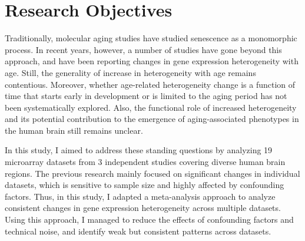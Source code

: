 \section{Research Objectives}
Traditionally, molecular aging studies have studied senescence as a monomorphic process. 
In recent years, however, a number of studies have gone beyond this approach, 
and have been reporting changes in gene expression heterogeneity with age. 
Still, the generality of increase in heterogeneity with age remains contentious.
Moreover, whether age-related heterogeneity change is a function of time that starts early in development or 
is limited to the aging period has not been systematically explored.
Also, the functional role of increased heterogeneity and 
its potential contribution to the emergence of aging-associated phenotypes in the human brain still remains unclear.

In this study, I aimed to address these standing questions by analyzing 19 microarray datasets from 3 independent studies covering diverse human brain regions.
The previous research mainly focused on significant changes in individual datasets, which is sensitive to sample size and highly affected by confounding factors.
Thus, in this study, I adapted a meta-analysis approach to analyze consistent changes in gene expression heterogeneity across multiple datasets.
Using this approach, I managed to reduce the effects of confounding factors and technical noise, and identify weak but consistent patterns across datasets.
